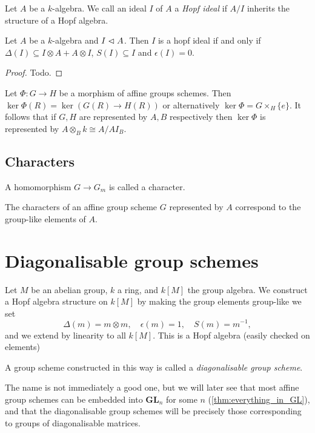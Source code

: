 \documentclass{memoir}
\begin{document}
\begin{definition}
    Let $A$ be a $k$-algebra. 
    We call an ideal $I$ of $A$ a \textit{Hopf ideal} if $A/I$ inherits the structure of a Hopf algebra.
\end{definition}
\begin{proposition}
    Let $A$ be a $k$-algebra and $I\vartriangleleft A$. Then $I$ is a hopf ideal if and only if $\Delta(I)\subseteq I\otimes A + A\otimes I$, $S(I)\subseteq I$ and $\epsilon(I) = 0$.
\end{proposition}
\begin{proof}
    Todo.
\end{proof}
\begin{definition}
    Let $\Phi:G\to H$ be a morphism of affine groups schemes. 
    Then $\ker\Phi (R) = \ker(G(R)\to H(R))$ or alternatively $\ker\Phi = G\times_H\{e\}$.
    It follows that if $G,H$ are represented by $A,B$ respectively then $\ker\Phi$ is represented by $A\otimes_B k\cong A/AI_B$.
\end{definition}
\subsection{Characters}
\begin{definition}
    A homomorphism $G\to G_m$ is called a character.
\end{definition}
\begin{theorem}\label{thm:characters_are_gp-like_elems}
    The characters of an affine group scheme $G$ represented by $A$ correspond to the group-like elements of $A$.
\end{theorem}
\section{Diagonalisable group schemes}\label{sec:diag_gp_sch}

Let $ M $ be an abelian group, $ k $ a ring, and $ k[M] $ the group algebra. We construct a Hopf algebra structure on $ k[M] $ by making the group elements group-like \ie we set \[ \Delta(m)=m\otimes m,\quad \epsilon(m)=1,\quad S(m)=m^{-1}, \] and we extend by linearity to all $ k[M] $. This is a Hopf algebra (easily checked on elements)
\begin{definition}\label{def:diag_gp_sch}
	A group scheme constructed in this way is called a \emph{diagonalisable group scheme}.
\end{definition}
The name is not immediately a good one, but we will later see that most affine group schemes can be embedded into $ \mathbf{GL}_n $ for some $ n $ (\cref{thm:everything_in_GL}), and that the diagonalisable group schemes will be precisely those corresponding to groups of diagonalisable matrices. 
\end{document}
